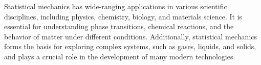 Statistical mechanics has wide-ranging applications in various scientific disciplines, including physics, chemistry, biology, and materials science. It is essential for understanding phase transitions, chemical reactions, and the behavior of matter under different conditions. Additionally, statistical mechanics forms the basis for exploring complex systems, such as gases, liquids, and solids, and plays a crucial role in the development of many modern technologies.